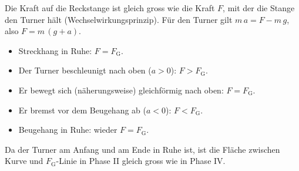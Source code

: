 Die Kraft auf die Reckstange ist gleich gross wie die Kraft $F$, mit der die Stange den Turner hält (Wechselwirkungsprinzip). Für den Turner gilt $m\,a = F - m\,g$, also $F = m\,(g+a)$.

\begin{center}
\end{center}

\begin{itemize}
\item[I] Streckhang in Ruhe: $F = F_\text{G}$.
\item[II] Der Turner beschleunigt nach oben ($a > 0$): $F > F_\text{G}$.
\item[III] Er bewegt sich (näherungsweise) gleichförmig nach oben: $F = F_\text{G}$.
\item[IV] Er bremst vor dem Beugehang ab ($a < 0$): $F < F_\text{G}$.
\item[V] Beugehang in Ruhe: wieder $F = F_\text{G}$.
\end{itemize}
Da der Turner am Anfang und am Ende in Ruhe ist, ist die Fläche zwischen Kurve und $F_\text{G}$-Linie in Phase II gleich gross wie in Phase IV.
